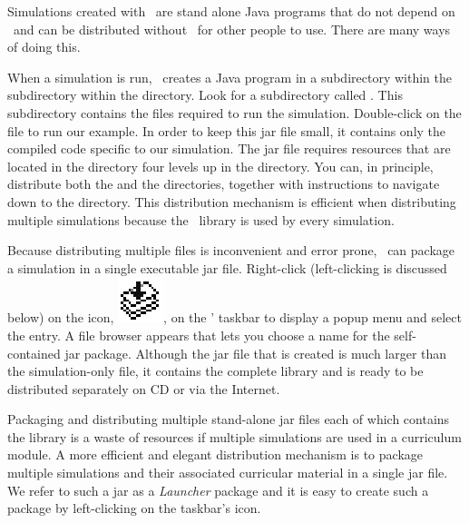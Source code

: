 Simulations created with \ejs\ are stand alone Java programs that do not depend on \ejs\ and can be distributed without \ejs\ for other people to use. There are many ways of doing this.

When a simulation is run, \ejs\ creates a Java program in a subdirectory within the  subdirectory within the  directory. Look for a subdirectory called  . This subdirectory contains the files required to run the simulation. Double-click on the  file to run our example. In order to keep this jar file small, it contains only the compiled code specific to our simulation.  The jar file requires resources that are located in the  directory four levels up in the  directory.  You can, in principle, distribute both the  and the  directories, together with instructions to navigate down to the  directory.  This distribution mechanism is efficient when distributing multiple simulations because the \ejs\ library is used by every simulation.

Because distributing multiple files is inconvenient and error prone, \ejs\ can package a simulation in a single executable jar file. Right-click (left-clicking is discussed below) on the  icon, \includegraphics[scale=\linescale]{images/package.eps}, on the \ejs' taskbar to display a popup menu and select the  entry. A file browser appears that lets you choose a name for the self-contained jar package. Although the jar file that is created is much larger than the simulation-only file, it contains the complete library and is ready to be distributed separately on CD or via the Internet.

Packaging and distributing multiple stand-alone jar files each of which contains the library is a waste of resources if multiple simulations are used in a curriculum module.  A more efficient and elegant distribution mechanism is to package multiple simulations and their associated curricular material in a single jar file. We refer to such a jar as  a \emph{Launcher} package and it is easy to create such a package by left-clicking on the taskbar's  icon.

